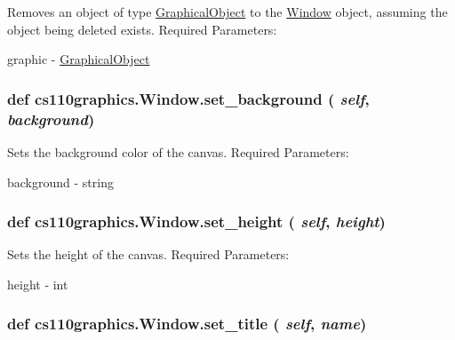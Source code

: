 Removes an object of type \hyperlink{classcs110graphics_1_1GraphicalObject}{GraphicalObject} to the \hyperlink{classcs110graphics_1_1Window}{Window} object, assuming the object being deleted exists. Required Parameters:
\begin{DoxyItemize}
\item graphic -\/ \hyperlink{classcs110graphics_1_1GraphicalObject}{GraphicalObject} 
\end{DoxyItemize}\hypertarget{classcs110graphics_1_1Window_a981a3115f1f22099549117313f38333c}{
\subsubsection[{set\_\-background}]{\setlength{\rightskip}{0pt plus 5cm}def cs110graphics.Window.set\_\-background ( {\em self}, \/   {\em background})}}
\label{classcs110graphics_1_1Window_a981a3115f1f22099549117313f38333c}


Sets the background color of the canvas. Required Parameters:
\begin{DoxyItemize}
\item background -\/ string 
\end{DoxyItemize}\hypertarget{classcs110graphics_1_1Window_a9b548549f8f09ca3f29e6e80483e21d2}{
\subsubsection[{set\_\-height}]{\setlength{\rightskip}{0pt plus 5cm}def cs110graphics.Window.set\_\-height ( {\em self}, \/   {\em height})}}
\label{classcs110graphics_1_1Window_a9b548549f8f09ca3f29e6e80483e21d2}


Sets the height of the canvas. Required Parameters:
\begin{DoxyItemize}
\item height -\/ int 
\end{DoxyItemize}\hypertarget{classcs110graphics_1_1Window_a227c806c2acbcaca9958ba3b610a85f6}{
\subsubsection[{set\_\-title}]{\setlength{\rightskip}{0pt plus 5cm}def cs110graphics.Window.set\_\-title ( {\em self}, \/   {\em name})}}
\label{classcs110graphics_1_1Window_a227c806c2acbcaca9958ba3b610a85f6}



